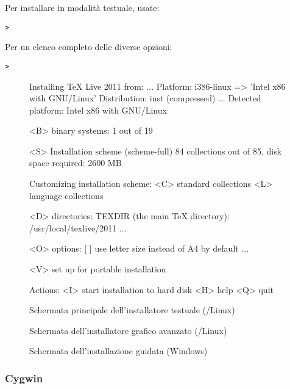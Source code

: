 \documentclass{article}
\begin{document}
Per installare in modalità testuale, usate:
\begin{alltt}
> 
\end{alltt}

Per un elenco completo delle diverse opzioni:
\begin{alltt}
> 
\end{alltt}

\begin{figure}[tb]
\begin{boxedverbatim}
Installing TeX Live 2011 from: ...
Platform: i386-linux => 'Intel x86 with GNU/Linux'
Distribution: inst (compressed)
...
 Detected platform: Intel x86 with GNU/Linux

 <B> binary systems: 1 out of 19

 <S> Installation scheme (scheme-full)
     84 collections out of 85, disk space required: 2600 MB

 Customizing installation scheme:
   <C> standard collections
   <L> language collections

 <D> directories:
   TEXDIR (the main TeX directory):
     /usr/local/texlive/2011
   ...

 <O> options:
   [ ] use letter size instead of A4 by default
   ...

 <V> set up for portable installation

Actions:
 <I> start installation to hard disk
 <H> help
 <Q> quit
\end{boxedverbatim}
\caption{Schermata principale dell'installatore testuale
  (\GNU/Linux)}\label{fig:text-main}
\end{figure}

\begin{figure}[tb]
\caption{Schermata dell'installatore grafico avanzato
  (\GNU/Linux)}\label{fig:gui-main}
\end{figure}

\begin{figure}[tb]
\caption{Schermata dell'installazione guidata
  (Windows)}\label{fig:wizard-w32}
\end{figure}


\subsubsection{Cygwin}
\label{sec:cygwin}
\end{document}
